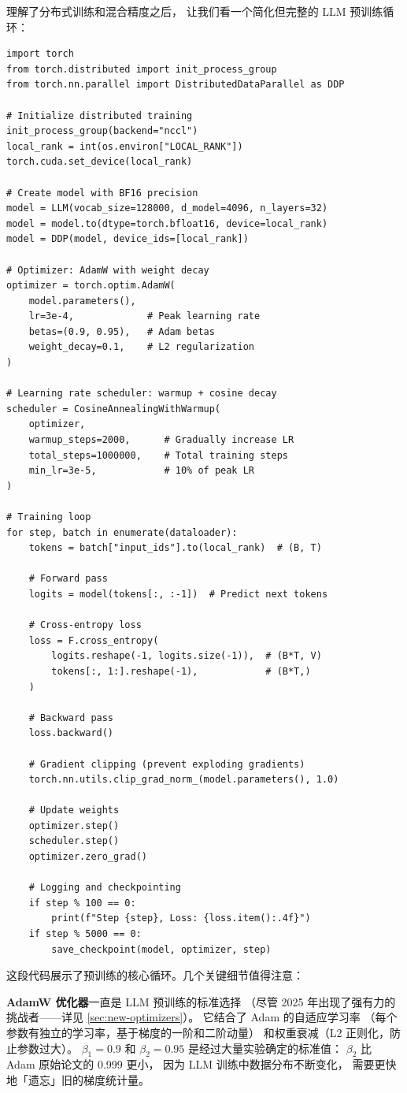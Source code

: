 理解了分布式训练和混合精度之后，
让我们看一个简化但完整的 LLM 预训练循环：

\begin{lstlisting}[caption={Simplified LLM pre-training loop}]
import torch
from torch.distributed import init_process_group
from torch.nn.parallel import DistributedDataParallel as DDP

# Initialize distributed training
init_process_group(backend="nccl")
local_rank = int(os.environ["LOCAL_RANK"])
torch.cuda.set_device(local_rank)

# Create model with BF16 precision
model = LLM(vocab_size=128000, d_model=4096, n_layers=32)
model = model.to(dtype=torch.bfloat16, device=local_rank)
model = DDP(model, device_ids=[local_rank])

# Optimizer: AdamW with weight decay
optimizer = torch.optim.AdamW(
    model.parameters(),
    lr=3e-4,             # Peak learning rate
    betas=(0.9, 0.95),   # Adam betas
    weight_decay=0.1,    # L2 regularization
)

# Learning rate scheduler: warmup + cosine decay
scheduler = CosineAnnealingWithWarmup(
    optimizer,
    warmup_steps=2000,      # Gradually increase LR
    total_steps=1000000,    # Total training steps
    min_lr=3e-5,            # 10% of peak LR
)

# Training loop
for step, batch in enumerate(dataloader):
    tokens = batch["input_ids"].to(local_rank)  # (B, T)

    # Forward pass
    logits = model(tokens[:, :-1])  # Predict next tokens

    # Cross-entropy loss
    loss = F.cross_entropy(
        logits.reshape(-1, logits.size(-1)),  # (B*T, V)
        tokens[:, 1:].reshape(-1),            # (B*T,)
    )

    # Backward pass
    loss.backward()

    # Gradient clipping (prevent exploding gradients)
    torch.nn.utils.clip_grad_norm_(model.parameters(), 1.0)

    # Update weights
    optimizer.step()
    scheduler.step()
    optimizer.zero_grad()

    # Logging and checkpointing
    if step % 100 == 0:
        print(f"Step {step}, Loss: {loss.item():.4f}")
    if step % 5000 == 0:
        save_checkpoint(model, optimizer, step)
\end{lstlisting}

这段代码展示了预训练的核心循环。几个关键细节值得注意：

\textbf{AdamW 优化器}一直是 LLM 预训练的标准选择
（尽管 2025 年出现了强有力的挑战者——详见 \cref{sec:new-optimizers}）。
它结合了 Adam 的自适应学习率
（每个参数有独立的学习率，基于梯度的一阶和二阶动量）
和权重衰减（L2 正则化，防止参数过大）。
$\beta_1 = 0.9$ 和 $\beta_2 = 0.95$ 是经过大量实验确定的标准值：
$\beta_2$ 比 Adam 原始论文的 0.999 更小，
因为 LLM 训练中数据分布不断变化，
需要更快地「遗忘」旧的梯度统计量。

